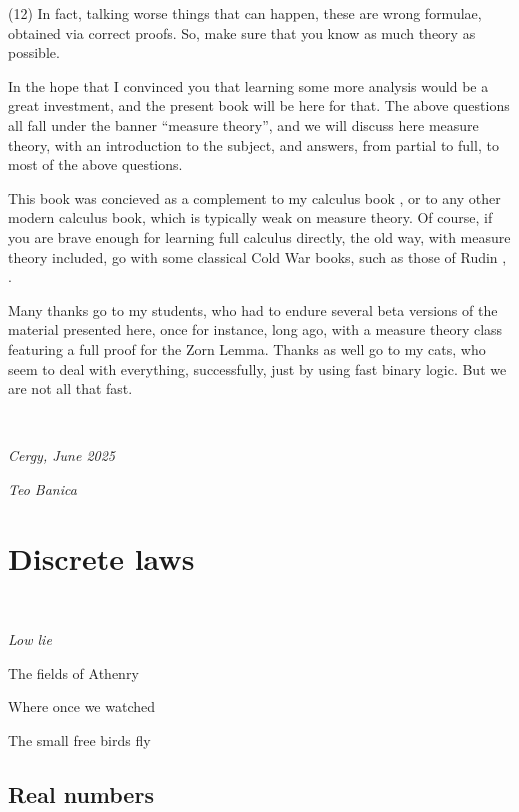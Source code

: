 \documentclass[12pt]{amsbook}
\begin{document}
\bigskip

(12) In fact, talking worse things that can happen, these are wrong formulae, obtained via correct proofs. So, make sure that you know as much theory as possible.

\bigskip 

In the hope that I convinced you that learning some more analysis would be a great investment, and the present book will be here for that. The above questions all fall under the banner ``measure theory'', and we will discuss here measure theory, with an introduction to the subject, and answers, from partial to full, to most of the above questions.

\bigskip

This book was concieved as a complement to my calculus book \cite{ba1}, or to any other modern calculus book, which is typically weak on measure theory. Of course, if you are brave enough for learning full calculus directly, the old way, with measure theory included, go with some classical Cold War books, such as those of Rudin \cite{ru1}, \cite{ru2}.

\bigskip

Many thanks go to my students, who had to endure several beta versions of the material presented here, once for instance, long ago, with a measure theory class featuring a full proof for the Zorn Lemma. Thanks as well go to my cats, who seem to deal with everything, successfully, just by using fast binary logic. But we are not all that fast.

\bigskip

\

{\em Cergy, June 2025}

\smallskip

{\em Teo Banica}

\baselineskip=15.95pt
\tableofcontents
\baselineskip=14pt

\part{Discrete laws}

\ \vskip50mm

\begin{center}
{\em Low lie 

The fields of Athenry

Where once we watched

The small free birds fly}
\end{center}

\chapter{Real numbers}
\end{document}
